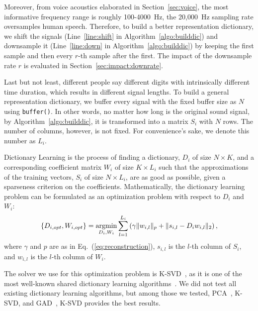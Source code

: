 

Moreover, from voice acoustics elaborated in Section~\ref{sec:voice}, the most informative frequency range is roughly 100-4000~Hz, the 20,000~Hz sampling rate oversamples human speech. Therefore, to build a better representation dictionary, we shift the signals (Line~\ref{line:shift} in Algorithm~\ref{algo:builddic}) and downsample it (Line~\ref{line:down} in Algorithm~\ref{algo:builddic}) by keeping the first sample and then every $r$-th sample after the first. The impact of the downsample rate $r$ is evaluated in Section~\ref{sec:impact:downrate}.

Last but not least, different people say different digits with intrinsically different time duration, which results in different signal lengths. To build a general representation dictionary, we buffer every signal with the fixed buffer size as $N$ using \verb|buffer()|. In other words, no matter how long is the original sound signal, by Algorithm~\ref{algo:builddic}, it is transformed into a matrix $S_i$ with $N$ rows. The number of columns, however, is not fixed. For convenience's sake, we denote this number as $L_i$.




 
Dictionary Learning is the process of finding a dictionary, $D_i$ of size $N \times K$, and a corresponding coefficient matrix $W_i$ of size $K \times L_i$ such that the approximations of the training vectors, $S_i$ of size $N \times L_i$, are as good as possible, given a sparseness criterion on the coefficients. Mathematically, the dictionary learning problem can be formulated as an optimization problem with respect to $D_i$ and $W_i$:
\begin{displaymath}
	\left\lbrace 
	D_{i, opt},
	W_{i, opt}
	\right\rbrace 
	=
	\operatorname*{argmin}_{D_i, W_i}
	\sum_{l=1}^{L_i}
	\left( 
	\gamma
	\Vert w_{i, l} \Vert_p
	+
	\Vert s_{i,l} - D_i w_{i, l} \Vert_2
	\right) 
	,
\end{displaymath}
where $\gamma$ and $p$ are as in Eq.~(\ref{eq:reconstruction}), $s_{i, l}$ is the $l$-th column of $S_i$, and $w_{i, l}$ is the $l$-th column of $W_i$. 




The solver we use for this optimization problem is K-SVD~\cite{aharon2006k}, as it is one of the most well-known shared dictionary learning algorithms~\cite{xu2017survey}. We did not test all existing dictionary learning algorithms, but among those we tested, PCA~\cite{haykin2007neural}, K-SVD,  and GAD~\cite{jafari2011fast}, K-SVD provides the best results. 




